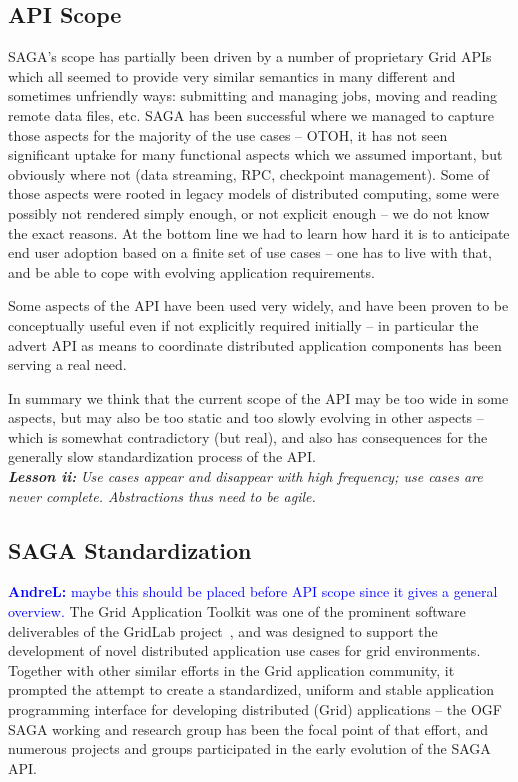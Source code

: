 \documentclass[]{article}
\newcommand{\I}[1]{\textit{#1}}
\newcommand{\B}[1]{\textbf{#1}}
\newcommand{\BI}[1]{\textbf{\textit{#1}}}
\newcommand{\alnote}[1]{{\textcolor{blue}{    \B{AndreL:  } #1 }}}
\newcommand{\alnote}[1]{}
\begin{document}
 \subsection{API Scope}

  SAGA's scope has partially been driven by a number of proprietary
  Grid APIs which all seemed to provide very similar semantics in many
  different and sometimes unfriendly ways: submitting and managing
  jobs, moving and reading remote data files, etc.  SAGA has been
  successful where we managed to capture those aspects for the
  majority of the use cases -- OTOH, it has not seen significant
  uptake for many functional aspects which we assumed important, but
  obviously where not (data streaming, RPC, checkpoint management).
  Some of those aspects were rooted in legacy models of distributed
  computing, some were possibly not rendered simply enough, or not
  explicit enough -- we do not know the exact reasons.  At the bottom
  line we had to learn how hard it is to anticipate end user adoption
  based on a finite set of use cases -- one has to live with that, and
  be able to cope with evolving application requirements.

  Some aspects of the API have been used very widely, and have been
  proven to be conceptually useful even if not explicitly required
  initially -- in particular the advert API as means to coordinate
  distributed application components has been serving a real need.

  In summary we think that the current scope of the API may be too
  wide in some aspects, but may also be too static and too slowly
  evolving in other aspects -- which is somewhat contradictory (but
  real), and also has consequences for the generally slow
  standardization process of the API.\\
  \BI{Lesson ii:} \I{Use cases appear and disappear with high frequency;
  use cases are never complete.  Abstractions thus need to be agile.}


 \subsection{SAGA Standardization}
  \alnote{maybe this should be placed before API scope since it gives a 
  general overview.}
  The Grid Application Toolkit was one of the prominent software
  deliverables of the GridLab project~\cite{gridlab}, and was designed
  to support the development of novel distributed application use
  cases for grid environments.  Together with other similar efforts in
  the Grid application community, it prompted the attempt to create
  a standardized, uniform and stable application programming interface
  for developing distributed (Grid) applications -- the OGF SAGA
  working and research group has been the focal point of that effort,
  and numerous projects and groups participated in the early
  evolution of the SAGA API.  
\end{document}
